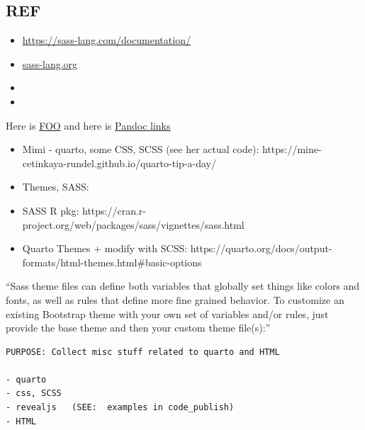 \documentclass[
]{report}
\providecommand{\tightlist}{%
  \setlength{\itemsep}{0pt}\setlength{\parskip}{0pt}}
\begin{document}
\subsection{REF}\label{ref}

\begin{itemize}
\item
  \url{https://sass-lang.com/documentation/}
\item
  \href{https://sass-lang.com/documentation/}{sass-lang.org}
\item
\item
\end{itemize}

Here is \href{https://sass-lang.com/documentation/}{FOO} and here is
\href{https://pandoc.org/MANUAL.html\#inline-links}{Pandoc links}

\begin{tcolorbox}[enhanced jigsaw, arc=.35mm, bottomrule=.15mm, bottomtitle=1mm, breakable, colback=white, colbacktitle=quarto-callout-tip-color!10!white, colframe=quarto-callout-tip-color-frame, coltitle=black, left=2mm, leftrule=.75mm, opacityback=0, opacitybacktitle=0.6, rightrule=.15mm, title=\textcolor{quarto-callout-tip-color}{\faLightbulb}\hspace{0.5em}{References, click to expand}, titlerule=0mm, toprule=.15mm, toptitle=1mm]

\begin{itemize}
\tightlist
\item
  Mimi - quarto, some CSS, SCSS (see her actual code):
  https://mine-cetinkaya-rundel.github.io/quarto-tip-a-day/\\
\item
  Themes, SASS:
\item
  SASS R pkg:
  https://cran.r-project.org/web/packages/sass/vignettes/sass.html\\
\item
  Quarto Themes + modify with SCSS:
  https://quarto.org/docs/output-formats/html-themes.html\#basic-options
  ~
\end{itemize}

\end{tcolorbox}

``Sass theme files can define both variables that globally set things
like colors and fonts, as well as rules that define more fine grained
behavior. To customize an existing Bootstrap theme with your own set of
variables and/or rules, just provide the base theme and then your custom
theme file(s):''

\begin{verbatim}
PURPOSE: Collect misc stuff related to quarto and HTML

- quarto 
- css, SCSS
- revealjs   (SEE:  examples in code_publish)
- HTML
\end{verbatim}
\end{document}
